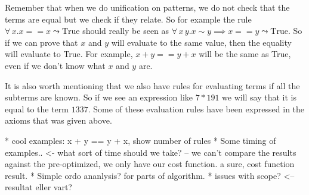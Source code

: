 Remember that when we do unification on patterns, we do not check that the terms
are equal but we check if they relate. So for example the rule $\forall \, x. x == x \leadsto \text{True}$
should really be seen as $\forall \, x \, y. x \sim y \implies x == y \leadsto \text{True}$.
So if we can prove that $x$ and $y$ will evaluate to the same value, then the equality
will evaluate to True. For example, $x + y == y + x$ will be the same as True, even
if we don't know what $x$ and $y$ are.

It is also worth mentioning that we also have rules for evaluating terms if all
the subterms are known. So if we see an expression like $7 * 191$ we will say that
it is equal to the term $1337$. Some of these evaluation rules have been expressed
in the axioms that was given above.






* cool examples:  x + y == y + x, show number of rules
* Some timing of examples.. <- what sort of time should we take?
-- we can't compare the results against the pre-optimized, we only have our cost function.
a sure, cost function result.
* Simple ordo ananlysis? for parts of algorithm.
* issues with scope? <-- resultat eller vart?
